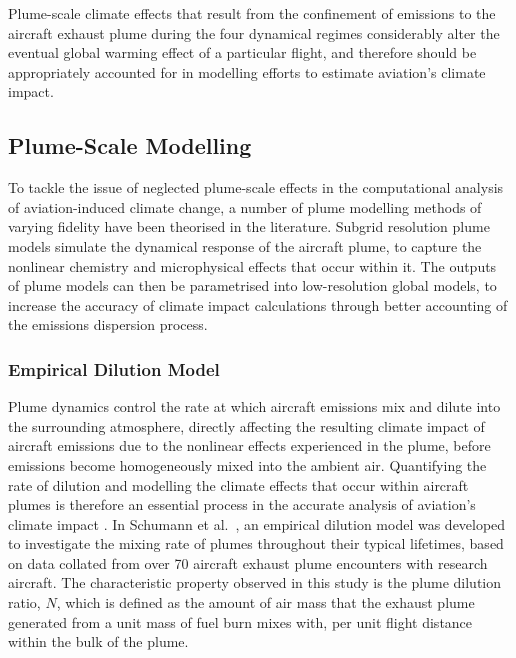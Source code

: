 Plume-scale climate effects that result from the confinement of emissions to the aircraft exhaust plume during the four dynamical regimes considerably alter the eventual global warming effect of a particular flight, and therefore should be appropriately accounted for in modelling efforts to estimate aviation's climate impact.

\subsection{Plume-Scale Modelling}
To tackle the issue of neglected plume-scale effects in the computational analysis of aviation-induced climate change, a number of plume modelling methods of varying fidelity have been theorised in the literature. Subgrid resolution plume models simulate the dynamical response of the aircraft plume, to capture the nonlinear chemistry and microphysical effects that occur within it. The outputs of plume models can then be parametrised into low-resolution global models, to increase the accuracy of climate impact calculations through better accounting of the emissions dispersion process. 

\subsubsection{Empirical Dilution Model}
Plume dynamics control the rate at which aircraft emissions mix and dilute into the surrounding atmosphere, directly affecting the resulting climate impact of aircraft emissions due to the nonlinear effects experienced in the plume, before emissions become homogeneously mixed into the ambient air. Quantifying the rate of dilution and modelling the climate effects that occur within aircraft plumes is therefore an essential process in the accurate analysis of aviation's climate impact \cite{Schumann1995}. In Schumann et al.\ \cite{Schumann1998}, an empirical dilution model was developed to investigate the mixing rate of plumes throughout their typical lifetimes, based on data collated from over 70 aircraft exhaust plume encounters with research aircraft. The characteristic property observed in this study is the plume dilution ratio, $N$, which is defined as the amount of air mass that the exhaust plume generated from a unit mass of fuel burn mixes with, per unit flight distance within the bulk of the plume. 

